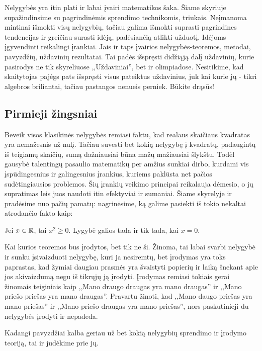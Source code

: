 Nelygybės yra itin plati ir labai įvairi matematikos šaka. Šiame skyriuje
supažindinsime su pagrindinėmis sprendimo technikomis, triukais. Neįmanoma
mintinai išmokti visų nelygybių, tačiau galima išmokti suprasti pagrindines
tendencijas ir greičiau surasti idėją, padėsiančią atlikti užduotį.
Idėjoms įgyvendinti reikalingi įrankiai. Jais ir taps įvairios
nelygybės-teoremos, metodai, pavyzdžių, uždavinių rezultatai. Tai padės
išspręsti didžiąją dalį uždavinių, kurie pasirodys ne tik skyreliuose
,,Uždaviniai'', bet ir olimpiadose. Nesitikime, kad skaitytojas pajėgs pats
išspręsti visus pateiktus uždavinius, juk kai kurie jų - tikri algebros
briliantai, tačiau pastangos nenueis perniek. Būkite drąsūs!

\newpage
\subsection{Pirmieji žingsniai}

Beveik visos klasikinės nelygybės remiasi faktu, kad realaus skaičiaus
kvadratas yra nemažesnis už nulį. Tačiau suvesti bet kokią nelygybę į
kvadratų, padaugintų iš teigiamų skaičių, sumą dažniausiai būna mažų
mažiausiai šlykštu. Todėl gausybė talentingų pasaulio matematikų per
amžius sunkiai dirbo, kurdami vis įspūdingesnius ir galingesnius įrankius,
kuriems paklūsta net pačios sudėtingiausios problemos. Šių įrankių veikimo
principai reikalauja dėmesio, o jų supratimas leis juos naudoti itin
efektyviai ir sumaniai. Šiame skyrelyje ir pradėsime nuo pačių pamatų:
nagrinėsime, ką galime pasiekti iš tokio nekaltai atrodančio fakto kaip:

\begin{thm}
  Jei $x\in\mathbb R$, tai $x^2\geq0$. Lygybė galios tada ir tik tada, kai $x=0$.
\end{thm}

Kai kurios teoremos bus įrodytos, bet tik ne ši. Žinoma, tai labai svarbi
nelygybė ir sunku įsivaizduoti nelygybę, kuri ja nesiremtų, bet įrodymas
yra toks paprastas, kad žymiai daugiau prasmės yra švaistyti popierių ir
laiką šnekant apie jos akivaizdumą negu iš tikrųjų ją įrodyti. Įrodymas
remiasi tokiais gerai žinomais teiginiais kaip ,,Mano draugo draugas yra
mano draugas'' ir  ,,Mano priešo priešas yra mano draugas''. Pravartu
žinoti, kad ,,Mano daugo priešas yra mano priešas'' ir ,,Mano priešo
draugas yra mano priešas'', nors  paskutinieji du nelygybės įrodyti ir
nepadeda.

Kadangi pavyzdžiai kalba geriau už bet kokią nelygybių sprendimo ir įrodymo
teoriją, tai ir judėkime prie jų.

